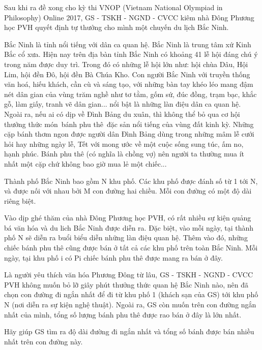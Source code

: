 Sau khi ra đề xong cho kỳ thi VNOP (Vietnam National Olympiad in Philosophy) Online 2017, GS - TSKH - NGND - CVCC kiêm nhà Đông Phương học PVH quyết định tự thưởng cho mình một chuyến du lịch Bắc Ninh.

Bắc Ninh là tỉnh nổi tiếng với dân ca quan hệ. Bắc Ninh là trung tâm xứ Kinh Bắc cổ xưa. Hiện nay trên địa bàn tỉnh Bắc Ninh có khoảng 41 lễ hội đáng chú ý trong năm được duy trì. Trong đó có những lễ hội lớn như: hội chùa Dâu, Hội Lim, hội đền Đô, hội đền Bà Chúa Kho. Con người Bắc Ninh với truyền thống văn hoá, hiếu khách, cần cù và sáng tạo, với những bàn tay khéo léo mang đậm nét dân gian của vùng trăm nghề như tơ tằm, gốm sứ, đúc đồng, trạm bạc, khắc gỗ, làm giấy, tranh vẽ dân gian... nổi bật là những làn điệu dân ca quan hệ. Ngoài ra, nếu ai có dịp về Đình Bảng du xuân, thì không thể bỏ qua cơ hội thưởng thức món bánh phu thê đặc sản nổi tiếng của vùng đất kinh kỳ. Những cặp bánh thơm ngon được người dân Đình Bảng dùng trong những mâm lễ cưới hỏi hay những ngày lễ, Tết với mong ước về một cuộc sống sung túc, ấm no, hạnh phúc. Bánh phu thê (có nghĩa là chồng vợ) nên người ta thường mua ít nhất một cặp chứ không bao giờ mua lẻ một chiếc...

Thành phố Bắc Ninh bao gồm N khu phố. Các khu phố được đánh số từ 1 tới N, và được nối với nhau bởi M con đường hai chiều. Mỗi con đường có một độ dài riêng biệt.

Vào dịp ghé thăm của nhà Đông Phương học PVH, có rất nhiều sự kiện quảng bá văn hóa và du lich Bắc Ninh được diễn ra. Đặc biệt, vào mỗi ngày, tại thành phố N sẽ diễn ra buổi biểu diễn những làn điệu quan hệ. Thêm vào đó, những chiếc bánh phu thê cũng được bán ở tất cả các khu phố trên toàn Bắc Ninh. Mỗi ngày, tại khu phố i có Pi chiếc bánh phu thê được mang ra bán ở đây.

Là người yêu thích văn hóa Phương Đông từ lâu, GS - TSKH - NGND - CVCC PVH không muốn bỏ lỡ giây phút thưởng thức quan hệ Bắc Ninh nào, nên đã chọn con đường đi ngắn nhất để đi từ khu phố 1 (khách sạn của GS) tới khu phố N (nơi diễn ra sự kiện nghệ thuật). Ngoài ra, GS còn muốn trên con đường ngắn nhất của mình, tổng số lượng bánh phu thê được rao bán ở đây là lớn nhất.

Hãy giúp GS tìm ra độ dài đường đi ngắn nhất và tổng số bánh được bán nhiều nhất trên con đường này.
